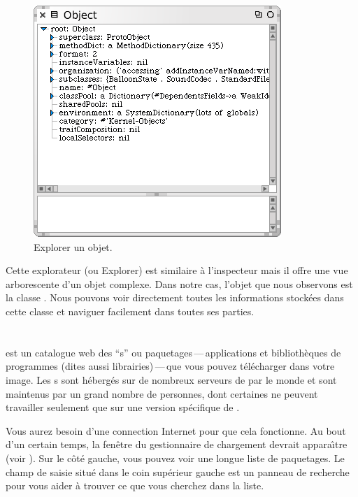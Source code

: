 \documentclass[a4paper,10pt,twoside]{book}
\begin{document}
\begin{figure}[htb]
\centerline {\includegraphics[scale=0.7]{ExploreIt}}
\caption{Explorer un objet.\label{fig:exploreit}}
\end{figure}

Cette explorateur (ou Explorer) est similaire \`a l'inspecteur mais il
offre une vue arborescente d'un objet complexe.
Dans notre cas, l'objet que nous observons est la classe .
Nous pouvons voir directement toutes les informations stock\'ees dans
cette classe et naviguer facilement dans toutes ses parties.

\section{\sqmap}

\sqmap est un catalogue web des ``s'' ou
paquetages\,---\,applications et biblioth\`eques de programmes (dites
aussi librairies)\,---\,que vous pouvez t\'el\'echarger dans votre
image.
Les s sont h\'eberg\'es sur de nombreux serveurs de
par le monde et sont maintenus par un grand nombre de personnes, dont
certaines ne peuvent travailler seulement que sur une version
sp\'ecifique de \sq.

Vous aurez besoin d'une connection Internet pour que cela
fonctionne. Au bout d'un certain temps, la fen\^etre du gestionnaire
de chargement \sqmap devrait appara\^{\i}tre (voir ).
Sur le c\^ot\'e gauche, vous pouvez voir une longue liste de
paquetages. Le champ de saisie situ\'e dans le coin sup\'erieur gauche
est un panneau de recherche pour vous aider \`a trouver ce que vous
cherchez dans la liste.
\end{document}
